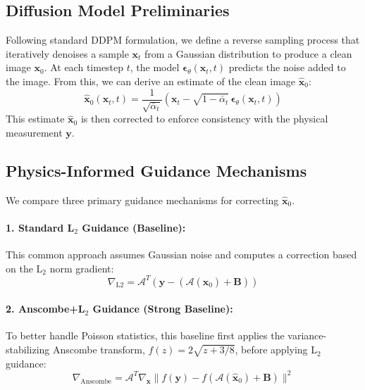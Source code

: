 \documentclass{article}
\begin{document}
\subsection{Diffusion Model Preliminaries}
Following standard DDPM formulation, we define a reverse sampling process that iteratively denoises a sample $\mathbf{x}_t$ from a Gaussian distribution to produce a clean image $\mathbf{x}_0$. At each timestep $t$, the model $\boldsymbol{\epsilon}_\theta(\mathbf{x}_t, t)$ predicts the noise added to the image. From this, we can derive an estimate of the clean image $\mathbf{\hat{x}}_0$:
\begin{equation}
    \mathbf{\hat{x}}_0(\mathbf{x}_t, t) = \frac{1}{\sqrt{\bar{\alpha}_t}}\left(\mathbf{x}_t - \sqrt{1-\bar{\alpha}_t}\,\boldsymbol{\epsilon}_\theta(\mathbf{x}_t, t)\right)
\end{equation}
This estimate $\mathbf{\hat{x}}_0$ is then corrected to enforce consistency with the physical measurement $\mathbf{y}$.

\subsection{Physics-Informed Guidance Mechanisms}
We compare three primary guidance mechanisms for correcting $\mathbf{\hat{x}}_0$.

\paragraph{1. Standard L$_2$ Guidance (Baseline):} This common approach assumes Gaussian noise and computes a correction based on the L$_2$ norm gradient:
\begin{equation}
\nabla_{\text{L2}} = \mathcal{A}^T(\mathbf{y} - (\mathcal{A}(\mathbf{\hat{x}}_0) + \mathbf{B}))
\end{equation}

\paragraph{2. Anscombe+L$_2$ Guidance (Strong Baseline):} To better handle Poisson statistics, this baseline first applies the variance-stabilizing Anscombe transform, $f(z) = 2\sqrt{z + 3/8}$, before applying L$_2$ guidance:
\begin{equation}
\nabla_{\text{Anscombe}} = \mathcal{A}^T \nabla_{\mathbf{x}} \|f(\mathbf{y}) - f(\mathcal{A}(\mathbf{\hat{x}}_0) + \mathbf{B})\|^2
\end{equation}
\end{document}
